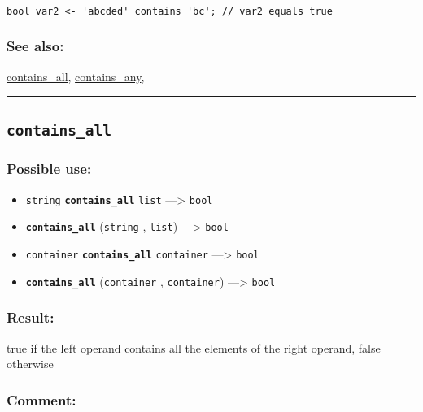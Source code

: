 \documentclass[]{book}
\providecommand{\tightlist}{%
  \setlength{\itemsep}{0pt}\setlength{\parskip}{0pt}}
\theoremstyle{definition}
\theoremstyle{definition}
\theoremstyle{definition}
\theoremstyle{remark}
\begin{document}
\begin{verbatim}
 
bool var2 <- 'abcded' contains 'bc'; // var2 equals true
\end{verbatim}

\subsubsection{See also:}\label{see-also-62}

\href{OperatorsBC\#contains_all}{contains\_all},
\href{OperatorsBC\#contains_any}{contains\_any},

\begin{center}\rule{0.5\linewidth}{\linethickness}\end{center}

\subsection{\texorpdfstring{\texttt{contains\_all}}{contains\_all}}\label{contains_all}

\subsubsection{Possible use:}\label{possible-use-100}

\begin{itemize}
\tightlist
\item
  \texttt{string} \textbf{\texttt{contains\_all}} \texttt{list}
  ---\textgreater{} \texttt{bool}
\item
  \textbf{\texttt{contains\_all}} (\texttt{string} , \texttt{list})
  ---\textgreater{} \texttt{bool}
\item
  \texttt{container} \textbf{\texttt{contains\_all}} \texttt{container}
  ---\textgreater{} \texttt{bool}
\item
  \textbf{\texttt{contains\_all}} (\texttt{container} ,
  \texttt{container}) ---\textgreater{} \texttt{bool}
\end{itemize}

\subsubsection{Result:}\label{result-98}

true if the left operand contains all the elements of the right operand,
false otherwise

\subsubsection{Comment:}\label{comment-25}
\end{document}
